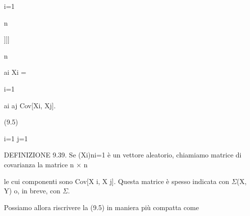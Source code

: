 \documentclass[a4paper,portrait,12pt]{article}
\begin{document}
\begin{flushleft}
i=1
\end{flushleft}





\begin{flushleft}
n
\end{flushleft}





]]]





\begin{flushleft}
n
\end{flushleft}





\begin{flushleft}
ai Xi =
\end{flushleft}


\begin{flushleft}
i=1
\end{flushleft}





\begin{flushleft}
ai aj Cov[Xi, Xj].
\end{flushleft}





(9.5)





\begin{flushleft}
i=1 j=1
\end{flushleft}





\begin{flushleft}
DEFINIZIONE 9.39. Se (Xi)ni=1 \`{e} un vettore aleatorio, chiamiamo matrice di covarianza la matrice n × n
\end{flushleft}


\begin{flushleft}
le cui componenti sono Cov[X i, X j]. Questa matrice \`{e} spesso indicata con $\Sigma$(X, Y) o, in breve, con $\Sigma$.
\end{flushleft}


\begin{flushleft}
Possiamo allora riscrivere la (9.5) in maniera più compatta come
\end{flushleft}
\end{document}
